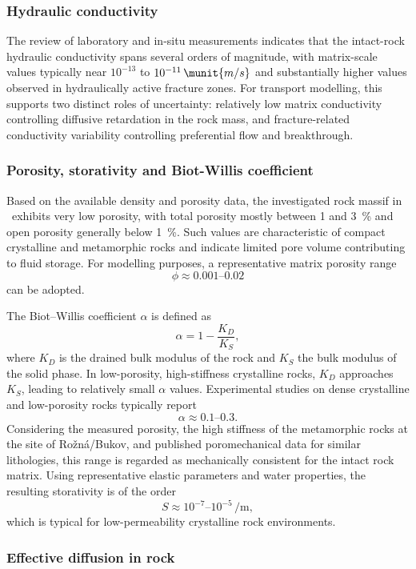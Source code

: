 \subsubsection{Hydraulic conductivity}
\label{sec:hydro_cond}

The review of laboratory and in-situ measurements indicates that the intact-rock hydraulic conductivity spans several orders of magnitude, with matrix-scale values typically near $10^{-13}$ to $10^{-11}\,\munit{m/s}$ and substantially higher values observed in hydraulically active fracture zones. For transport modelling, this supports two distinct roles of uncertainty: relatively low matrix conductivity controlling diffusive retardation in the rock mass, and fracture-related conductivity variability controlling preferential flow and breakthrough.

\subsubsection{Porosity, storativity and Biot-Willis coefficient}
\label{sec:storativity}

Based on the available density and porosity data, the investigated rock massif in \URFBII\ exhibits very low porosity, with total porosity mostly between 1 and 3~\% and open porosity generally below 1~\%. Such values are characteristic of compact crystalline and metamorphic rocks and indicate limited pore volume contributing to fluid storage. For modelling purposes, a representative matrix porosity range
\[
\phi \approx 0.001\text{--}0.02
\]
can be adopted.

The Biot--Willis coefficient $\alpha$ is defined as
\[
\alpha = 1-\frac{K_D}{K_S},
\]
where $K_D$ is the drained bulk modulus of the rock and $K_S$ the bulk modulus of the solid phase. In low-porosity, high-stiffness crystalline rocks, $K_D$ approaches $K_S$, leading to relatively small $\alpha$ values. Experimental studies on dense crystalline and low-porosity rocks typically report
\[
\alpha \approx 0.1\text{--}0.3.
\]
Considering the measured porosity, the high stiffness of the metamorphic rocks at the site of Rožná/Bukov, and published poromechanical data for similar lithologies, this range is regarded as mechanically consistent for the intact rock matrix. Using representative elastic parameters and water properties, the resulting storativity is of the order
\[
S \approx 10^{-7}\text{--}10^{-5}\,\unit{\per\meter},
\]
which is typical for low-permeability crystalline rock environments.

\subsubsection{Effective diffusion in rock}
\label{sec:review_diffusion}

